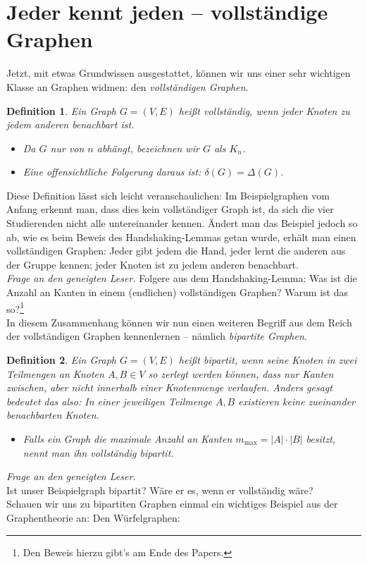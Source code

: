 \documentclass{article}
\newtheorem{definition}{Definition}
\begin{document}
\section{Jeder kennt jeden -- vollständige Graphen}
Jetzt, mit etwas Grundwissen ausgestattet, können wir uns einer sehr wichtigen Klasse an Graphen widmen: den \emph{vollständigen Graphen}.\\
\begin{definition}
	Ein Graph $G = (V, E)$ heißt \emph{vollständig}, wenn jeder Knoten zu jedem anderen benachbart ist.
	\begin{itemize}
		\item[$\rightarrow$] Da $G$ nur von $n$ abhängt, bezeichnen wir $G$ als $K_n$.
		\item[$\rightarrow$] Eine offensichtliche Folgerung daraus ist: $\delta(G) = \Delta(G)$.
	\end{itemize}
\end{definition}
\bigskip
Diese Definition lässt sich leicht veranschaulichen: Im Beispielgraphen vom Anfang erkennt man, dass dies kein vollständiger Graph ist, da sich die vier Studierenden nicht alle untereinander kennen. Ändert man das Beispiel jedoch so ab, wie es beim Beweis des Handshaking-Lemmas getan wurde, erhält man einen vollständigen Graphen: Jeder gibt jedem die Hand, jeder lernt die anderen aus der Gruppe kennen; jeder Knoten ist zu jedem anderen benachbart.\\
\bigskip
\emph{Frage an den geneigten Leser.} Folgere aus dem Handshaking-Lemma: Was ist die Anzahl an Kanten in einem (endlichen) vollständigen Graphen? Warum ist das so?\footnote[1]{Den Beweis hierzu gibt's am Ende des Papers.}\\
\bigskip
In diesem Zusammenhang können wir nun einen weiteren Begriff aus dem Reich der vollständigen Graphen kennenlernen -- nämlich \emph{bipartite Graphen}.\\
\begin{definition}
	Ein Graph $G = (V, E)$ heißt \emph{bipartit}, wenn seine Knoten in zwei Teilmengen an Knoten $A, B \in V$ so zerlegt werden können, dass nur Kanten \emph{zwischen}, aber nicht \emph{innerhalb} einer Knotenmenge verlaufen. Anders gesagt bedeutet das also: In einer jeweiligen Teilmenge $A, B$ existieren keine zueinander benachbarten Knoten.
	\begin{itemize}
		\item[$\rightarrow$] Falls ein Graph die \emph{maximale Anzahl an Kanten} $m_{\mathrm{max}} = |A| \cdot |B|$ besitzt, nennt man ihn \emph{vollständig bipartit}.
	\end{itemize}
\end{definition}
\bigskip
\emph{Frage an den geneigten Leser.}\\
Ist unser Beispielgraph bipartit? Wäre er es, wenn er vollständig wäre?\\
\bigskip
Schauen wir uns zu bipartiten Graphen einmal ein wichtiges Beispiel aus der Graphentheorie an: Den Würfelgraphen:\\
\newpage
\end{document}
